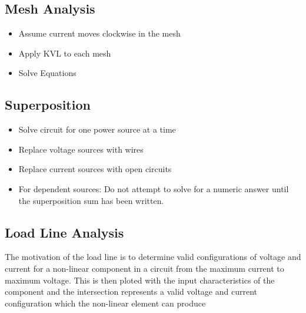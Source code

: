 \documentclass{article}
\begin{document}
\subsection*{Mesh Analysis}
\begin{itemize}
\item Assume current moves clockwise in the mesh
\item Apply KVL to each mesh
\item Solve Equations
\end{itemize}
\subsection*{Superposition}
\begin{itemize}
\item Solve circuit for one power source at a time
\item Replace voltage sources with wires
\item Replace current sources with open circuits
\item For dependent sources: Do not attempt to solve for a numeric answer until the superposition sum has been written.
\end{itemize}
\subsection*{Load Line Analysis}
The motivation of the load line is to determine valid configurations of voltage and current for a non-linear component in a circuit from the maximum current to maximum voltage. This is then ploted with the input characteristics of the component and the intersection represents a valid voltage and current configuration which the non-linear element can produce
\end{document}
